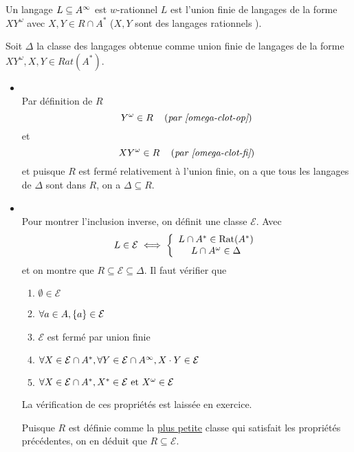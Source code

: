 \begin{prop}
	Un langage $L \subseteq A^{\infty}$ est $w$-rationnel \ssi $L$ est l'union finie de langages
	de la forme $XY^{\omega}$ avec $X,Y \in R \cap A^*$ ($X,Y$ sont des langages rationnels ).
\end{prop}

\begin{proofI}
	Soit $\Delta$ la classe des langages obtenue comme union finie de langages de la forme $XY^{\omega}, X,Y \in Rat(A^*)$.
	\begin{itemize}
		\item {} \\
		      Par définition de $R$
		      $$Y^{\omega} \in R \quad\left(\textit{par \ref{omega-clot-op}}\right)$$
		      et
		      $$XY^{\omega} \in R \quad\left(\textit{par \ref{omega-clot-fi}}\right)$$
		      et puisque $R$ est fermé relativement à l'union finie, on a que tous les langages de $\Delta$ sont dans $R$,
		      on a $\Delta \subseteq R$.
		\item {} \\

		      Pour montrer l'inclusion inverse, on définit une classe $\mathcal E$.
		      Avec
		      \begin{equation*}
			      L \in \mathcal E \iff
			      \left\{
			      \begin{array}{c}
				      L \cap A^* \in \text{Rat}(A^*) \\
				      L \cap A^{\omega} \in \Delta
			      \end{array}
			      \right.
		      \end{equation*}
		      et on montre que $R \subseteq \mathcal E \subseteq \Delta$.
		      Il faut vérifier que
		      \begin{enumerate}
			      \item $\emptyset \in \mathcal{E}$
			      \item $\forall a \in A, \left\{a\right\} \in  \mathcal{E}$
			      \item $\mathcal{E}$ est fermé par union finie

			      \item $\forall X \in \mathcal{E} \cap A^*, \forall Y \in \mathcal{E} \cap A^{\infty}, X \cdot Y \in \mathcal{E}$
			      \item $\forall X \in \mathcal{E} \cap A^*, X^* \in \mathcal{E} \text{ et } X^{\omega} \in \mathcal{E}$
		      \end{enumerate}
		      La vérification de ces propriétés est laissée en exercice.

		      Puisque $R$ est définie comme la \underline{plus petite} classe qui satisfait
		      les propriétés précédentes, on en déduit que $R \subseteq \mathcal{E}$.
	\end{itemize}
\end{proofI}


